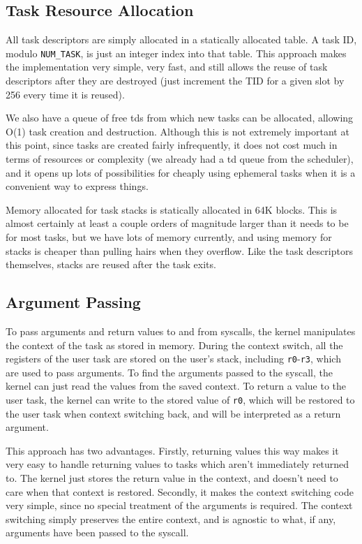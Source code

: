 \documentclass[titlepage]{article}
\begin{document}
\subsection{Task Resource Allocation}
All task descriptors are simply allocated in a statically allocated table.
A task ID, modulo \texttt{NUM\_TASK}, is just an integer index into that table.
This approach makes the implementation very simple, very fast, and still allows
the reuse of task descriptors after they are destroyed (just increment the TID
for a given slot by 256 every time it is reused).

We also have a queue of free tds from which new tasks can be allocated,
allowing O(1) task creation and destruction. Although this is not extremely
important at this point, since tasks are created fairly infrequently, it does
not cost much in terms of resources or complexity (we already had a td queue
from the scheduler), and it opens up lots of possibilities for cheaply using
ephemeral tasks when it is a convenient way to express things.

Memory allocated for task stacks is statically allocated in 64K blocks. This
is almost certainly at least a couple orders of magnitude larger than it needs
to be for most tasks, but we have lots of memory currently, and using memory
for stacks is cheaper than pulling hairs when they overflow.
Like the task descriptors themselves, stacks are reused after the task exits.

\subsection{Argument Passing}
To pass arguments and return values to and from syscalls, the kernel manipulates
the context of the task as stored in memory.
During the context switch, all the registers of the user task are stored on the
user's stack, including \texttt{r0}-\texttt{r3}, which are used to pass arguments.
To find the arguments passed to the syscall, the kernel can just read the values
from the saved context.
To return a value to the user task, the kernel can write to the stored value of
\texttt{r0}, which will be restored to the user task when context switching back,
and will be interpreted as a return argument.

This approach has two advantages.
Firstly, returning values this way makes it very easy to handle returning values
to tasks which aren't immediately returned to.
The kernel just stores the return value in the context, and doesn't need to care
when that context is restored.
Secondly, it makes the context switching code very simple, since no special treatment
of the arguments is required.
The context switching simply preserves the entire context, and is agnostic to what,
if any, arguments have been passed to the syscall.
\end{document}
